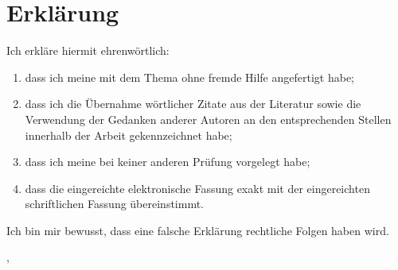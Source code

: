 
\thispagestyle{empty}

\section*{Erklärung}
\vspace*{2em}

Ich erkläre hiermit ehrenwörtlich: \\
\begin{enumerate}
\item dass ich meine {\arbeitsart} mit dem Thema
{\itshape \titel } ohne fremde Hilfe angefertigt habe;
\item dass ich die Übernahme wörtlicher Zitate aus der Literatur sowie die Verwendung der Gedanken
anderer Autoren an den entsprechenden Stellen innerhalb der Arbeit gekennzeichnet habe;
\item dass ich meine {\arbeitsart} bei keiner anderen Prüfung vorgelegt habe;
\item dass die eingereichte elektronische Fassung exakt mit der eingereichten schriftlichen Fassung
übereinstimmt.
\end{enumerate}

Ich bin mir bewusst, dass eine falsche Erklärung rechtliche Folgen haben wird.

\vspace{3em}

\abgabeort, \datumAbgabe
\vspace{4em}

\autor
